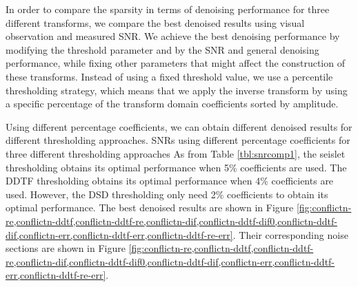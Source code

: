 In order to compare the sparsity in terms of denoising performance for three different transforms, we compare the best denoised results using  visual observation and measured SNR. We achieve the best denoising performance by modifying the threshold parameter and by  the SNR and general denoising performance, while fixing other parameters that might affect the construction of these transforms. Instead of using a fixed threshold value, we use a  percentile thresholding strategy, which means that we apply the inverse transform by using a specific percentage of the  transform domain coefficients sorted by amplitude. 


Using different percentage coefficients, we can obtain different denoised results for different thresholding approaches.   SNRs using different percentage coefficients for three different thresholding approaches As  from Table \ref{tbl:snrcomp1}, the seislet thresholding obtains its optimal performance when 5\% coefficients are used. The DDTF thresholding obtains its optimal performance when 4\% coefficients are used. However, the DSD thresholding only need 2\% coefficients to obtain its optimal performance. The best denoised results are shown in  Figure \ref{fig:conflictn-re,conflictn-ddtf,conflictn-ddtf-re,conflictn-dif,conflictn-ddtf-dif0,conflictn-ddtf-dif,conflictn-err,conflictn-ddtf-err,conflictn-ddtf-re-err}. Their corresponding noise sections are shown in  Figure \ref{fig:conflictn-re,conflictn-ddtf,conflictn-ddtf-re,conflictn-dif,conflictn-ddtf-dif0,conflictn-ddtf-dif,conflictn-err,conflictn-ddtf-err,conflictn-ddtf-re-err}.

